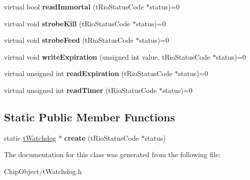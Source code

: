 \begin{DoxyCompactItemize}
\item 
\hypertarget{classnFPGA_1_1nFRC__2012__1__6__4_1_1tWatchdog_a539f6b415d5c16cc2d07d67ee18cf022}{
virtual bool {\bfseries readImmortal} (tRioStatusCode $\ast$status)=0}
\label{classnFPGA_1_1nFRC__2012__1__6__4_1_1tWatchdog_a539f6b415d5c16cc2d07d67ee18cf022}

\item 
\hypertarget{classnFPGA_1_1nFRC__2012__1__6__4_1_1tWatchdog_ae96a16f93953ca7f12c24b0ff6fa3549}{
virtual void {\bfseries strobeKill} (tRioStatusCode $\ast$status)=0}
\label{classnFPGA_1_1nFRC__2012__1__6__4_1_1tWatchdog_ae96a16f93953ca7f12c24b0ff6fa3549}

\item 
\hypertarget{classnFPGA_1_1nFRC__2012__1__6__4_1_1tWatchdog_ac86abe1374ba2d685c282a479a095330}{
virtual void {\bfseries strobeFeed} (tRioStatusCode $\ast$status)=0}
\label{classnFPGA_1_1nFRC__2012__1__6__4_1_1tWatchdog_ac86abe1374ba2d685c282a479a095330}

\item 
\hypertarget{classnFPGA_1_1nFRC__2012__1__6__4_1_1tWatchdog_ac64c86f4bfe7da1299a6d5c63dd2dc7e}{
virtual void {\bfseries writeExpiration} (unsigned int value, tRioStatusCode $\ast$status)=0}
\label{classnFPGA_1_1nFRC__2012__1__6__4_1_1tWatchdog_ac64c86f4bfe7da1299a6d5c63dd2dc7e}

\item 
\hypertarget{classnFPGA_1_1nFRC__2012__1__6__4_1_1tWatchdog_a7b0bc2c3c9c3240fb2c2007bade985a6}{
virtual unsigned int {\bfseries readExpiration} (tRioStatusCode $\ast$status)=0}
\label{classnFPGA_1_1nFRC__2012__1__6__4_1_1tWatchdog_a7b0bc2c3c9c3240fb2c2007bade985a6}

\item 
\hypertarget{classnFPGA_1_1nFRC__2012__1__6__4_1_1tWatchdog_a065c99c6e837f382bac05436dcbcb8fd}{
virtual unsigned int {\bfseries readTimer} (tRioStatusCode $\ast$status)=0}
\label{classnFPGA_1_1nFRC__2012__1__6__4_1_1tWatchdog_a065c99c6e837f382bac05436dcbcb8fd}

\end{DoxyCompactItemize}
\subsection*{Static Public Member Functions}
\begin{DoxyCompactItemize}
\item 
\hypertarget{classnFPGA_1_1nFRC__2012__1__6__4_1_1tWatchdog_a465d396203bb206c268f81a9f6f5204b}{
static \hyperlink{classnFPGA_1_1nFRC__2012__1__6__4_1_1tWatchdog}{tWatchdog} $\ast$ {\bfseries create} (tRioStatusCode $\ast$status)}
\label{classnFPGA_1_1nFRC__2012__1__6__4_1_1tWatchdog_a465d396203bb206c268f81a9f6f5204b}

\end{DoxyCompactItemize}


The documentation for this class was generated from the following file:\begin{DoxyCompactItemize}
\item 
ChipObject/tWatchdog.h\end{DoxyCompactItemize}
